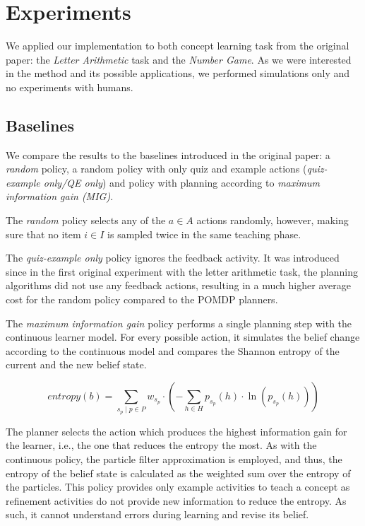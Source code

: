 
\section{Experiments}
We applied our implementation to both concept learning task from the original paper: the \textit{Letter Arithmetic} task and the \textit{Number Game}. 
As we were interested in the method and its possible applications, we performed simulations only and no experiments with humans.

\subsection{Baselines}

We compare the results to the baselines introduced in the original paper: a \textit{random} policy, a random policy with only quiz and example actions (\textit{quiz-example only/QE only}) and policy with planning according to \textit{maximum information gain (MIG)}.

The \textit{random} policy selects any of the $a \in A$ actions randomly, however, making sure that no item $i \in I$ is sampled twice in the same teaching phase.


The \textit{quiz-example only} policy ignores the feedback activity.
It was introduced since in the first original experiment with the letter arithmetic task, the planning algorithms did not use any feedback actions, resulting in a much higher average cost for the random policy compared to the POMDP planners.

The \textit{maximum information gain} policy performs a single planning step with the continuous learner model. For every possible action, it simulates the belief change according to the continuous model and compares the Shannon entropy of the current and the new belief state.

\begin{equation}
    entropy(b)=\sum_{s_p \mid p \in P}{w_{s_p}} \cdot \left( -\sum_{h \in H}{p_{s_p}(h) \cdot \ln\left( p_{s_p}(h) \right)} \right)
\end{equation}

The planner selects the action which produces the highest information gain for the learner, i.e., the one that reduces the entropy the most.
As with the continuous policy, the particle filter approximation is employed, and thus, the entropy of the belief state is calculated as the weighted sum over the entropy of the particles.
This policy provides only example activities to teach a concept as refinement activities do not provide new information to reduce the entropy.
As such, it cannot understand errors during learning and revise its belief.


